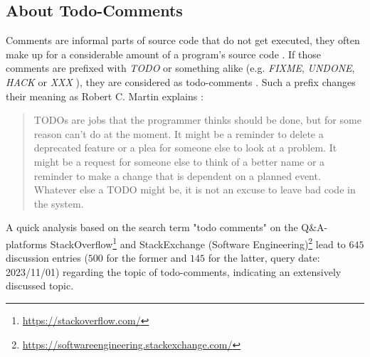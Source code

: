 \subsection{About Todo-Comments}
\label{sec:introduction-about-todo-comments}
Comments are informal parts of source code that do not get executed, they often make up for a considerable amount of a program's source code \cite{nie_natural_2018}.
If those comments are prefixed with \emph{TODO} or something alike (e.g. \emph{FIXME}, \emph{UNDONE}, \emph{HACK} or \emph{XXX} \cite{storey_how_2009}), they are considered as todo-comments \cite{ying_source_2005}.
Such a prefix changes their meaning as Robert C. Martin explains \cite[p. 59]{martin_clean_2009}:
%
\begin{quote}
    TODOs are jobs that the programmer thinks should be done, but for some reason can't do at the moment. It might be a reminder to delete a deprecated feature or a plea for someone else to look at a problem. It might be a request for someone else to think of a better name or a reminder to make a change that is dependent on a planned event. Whatever else a TODO might be, it is not an excuse to leave bad code in the system.
\end{quote}
%
A quick analysis based on the search term "todo comments" on the Q\&A-platforms StackOverflow\footnote{\url{https://stackoverflow.com/}} and StackExchange (Software Engineering)\footnote{\url{https://softwareengineering.stackexchange.com/}} lead to $645$ discussion entries ($500$ for the former and $145$ for the latter, query date: 2023/11/01) regarding the topic of todo-comments, indicating an extensively discussed topic.

